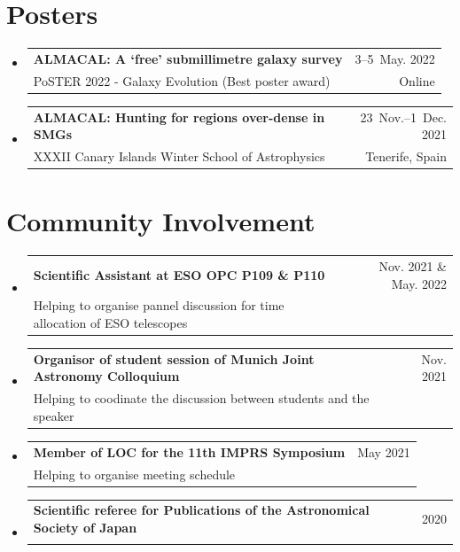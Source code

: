 \documentclass[A4,11pt]{article}
\makeatletter
\newcommand{\CVSubheading}[4]{
  \vspace{-2pt}\item
    \begin{tabular*}{0.97\textwidth}[t]{l@{\extracolsep{\fill}}r}
      \textbf{#1} & #2 \\
      \small#3 & \small #4 \\
    \end{tabular*}\vspace{-7pt}
}
\newcommand{\CVSubHeadingListStart}{\begin{itemize}[leftmargin=0.5cm, label={}]}
\newcommand{\CVSubHeadingListEnd}{\end{itemize}}
\makeatother
\begin{document}

\section{Posters}
  \CVSubHeadingListStart
    \CVSubheading
      {ALMACAL: A `free' submillimetre galaxy survey}{3--5~May. 2022}
      {PoSTER 2022 - Galaxy Evolution (Best poster award)}{Online}
    \CVSubheading
      {ALMACAL: Hunting for regions over-dense in SMGs}{23~Nov.--1~Dec. 2021}
      {XXXII Canary Islands Winter School of Astrophysics}{Tenerife, Spain}
  \CVSubHeadingListEnd

\section{Community Involvement}
  \CVSubHeadingListStart
    \CVSubheading
      {Scientific Assistant at ESO OPC P109 \& P110}{Nov. 2021 \& May. 2022}
      {Helping to organise pannel discussion for time allocation of ESO telescopes}{}
    \CVSubheading
      {Organisor of student session of Munich Joint Astronomy Colloquium}{Nov. 2021}
      {Helping to coodinate the discussion between students and the speaker}{}
    \CVSubheading
      {Member of LOC for the 11th IMPRS Symposium}{May 2021}
      {Helping to organise meeting schedule}{}

    \CVSubheading
      {Scientific referee for Publications of the Astronomical Society of Japan}{2020}
      {}{}
  \CVSubHeadingListEnd

\end{document}
